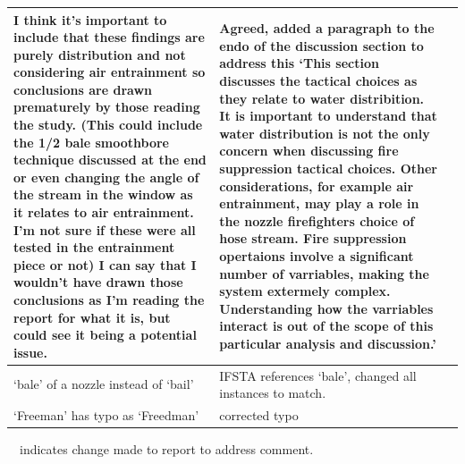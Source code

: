 \documentclass[12pt,oneside]{book}
\begin{document}
\begin{longtable}{|L{2.6in}|L{2.6in}|c|}
		\hline
		I think it's important to include that these findings are purely distribution and not considering air entrainment so conclusions are drawn prematurely by those reading the study. (This could include the 1/2 bale smoothbore technique discussed at the end or even changing the angle of the stream in the window as it relates to air entrainment. I'm not sure if these were all tested in the entrainment piece or not) I can say that I wouldn't have drawn those conclusions as I'm reading the report for what it is, but could see it being a potential issue. & 
		Agreed, added a paragraph to the endo of the discussion section to address this `This section discusses the tactical choices as they relate to water distribition. It is important to understand that water distribution is not the only concern when discussing fire suppression tactical choices. Other considerations, for example air entrainment, may play a role in the nozzle firefighters choice of hose stream. Fire suppression opertaions involve a significant number of varriables, making the system extermely complex. Understanding how the varriables interact is out of the scope of this particular analysis and discussion.' & \checkmark \\

		\hline
		`bale' of a nozzle instead of `bail' & 
		IFSTA references `bale', changed all instances to match. & \checkmark \\

		\hline
		`Freeman' has typo as `Freedman' & 
		corrected typo & \checkmark \\


\end{longtable}
\checkmark~~indicates change made to report to address comment.



\newpage
\end{document}
